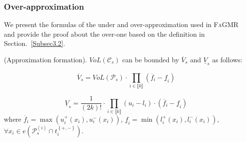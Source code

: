 \documentclass[runningheads]{llncs}
\newcommand{\ourtool}{\textsc{FaGMR}\xspace}
\begin{document}
\subsubsection{Over-approximation}
We present the formulas of the under and over-approximation used in \ourtool and provide the proof about the over-one based on the definition in Section.~\ref{Subsec3.2}.
\begin{theorem}
\label{theorem1}
(Approximation formation). $VoL(\mathcal{C}_{s})$ can be bounded by $\overline{V}_{s}$ and $\underline{V}_{s}$ as follows:

\begin{equation}\label{over}
\overline{V}_{s} = VoL(\mathcal{P}_{s}) \cdot \prod_{i\in \llbracket  k \rrbracket}^{}(\overline{f}_{i} - \underline{f}_{i})
\end{equation}

\begin{equation}\label{under}
\underline{V}_{s} = \dfrac{1}{(2k)!} \cdot \prod_{i\in \llbracket  k \rrbracket}^{} (u_{i} - l_{i}) \cdot(\overline{f}_{i} - \underline{f}_{i})
\end{equation}
where $\overline{f}_{i} = \max(u^{+ }_{i}(x_{i}),u^{-}_{i}(x_{i}))$, $\underline{f}_{i} = \min(l^{+ }_{i}(x_{i}),l^{-}_{i}(x_{i}))$, $\forall x_{i} \in  e(\mathcal{P}^{(i)}_{s} \cap t_{i}^{\left\{ +, -\right\}} )$.
\end{theorem}
\end{document}
